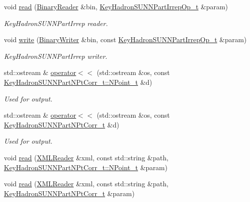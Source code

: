 \begin{DoxyCompactItemize}
\item 
void \mbox{\hyperlink{namespaceHadron_a05878acca51117e3c410ba16500c4ba5}{read}} (\mbox{\hyperlink{classADATIO_1_1BinaryReader}{Binary\+Reader}} \&bin, \mbox{\hyperlink{structHadron_1_1KeyHadronSUNNPartIrrepOp__t}{Key\+Hadron\+S\+U\+N\+N\+Part\+Irrep\+Op\+\_\+t}} \&param)
\begin{DoxyCompactList}\small\item\em Key\+Hadron\+S\+U\+N\+N\+Part\+Irrep reader. \end{DoxyCompactList}\item 
void \mbox{\hyperlink{namespaceHadron_a1ab9211268895b4f05c4d46ff18dff6d}{write}} (\mbox{\hyperlink{classADATIO_1_1BinaryWriter}{Binary\+Writer}} \&bin, const \mbox{\hyperlink{structHadron_1_1KeyHadronSUNNPartIrrepOp__t}{Key\+Hadron\+S\+U\+N\+N\+Part\+Irrep\+Op\+\_\+t}} \&param)
\begin{DoxyCompactList}\small\item\em Key\+Hadron\+S\+U\+N\+N\+Part\+Irrep writer. \end{DoxyCompactList}\item 
std\+::ostream \& \mbox{\hyperlink{namespaceHadron_a2559588d0550564638289369a0d3ba30}{operator$<$$<$}} (std\+::ostream \&os, const \mbox{\hyperlink{structHadron_1_1KeyHadronSUNNPartNPtCorr__t_1_1NPoint__t}{Key\+Hadron\+S\+U\+N\+N\+Part\+N\+Pt\+Corr\+\_\+t\+::\+N\+Point\+\_\+t}} \&d)
\begin{DoxyCompactList}\small\item\em Used for output. \end{DoxyCompactList}\item 
std\+::ostream \& \mbox{\hyperlink{namespaceHadron_af2ff7a4948a4b5cdeaabc1de5072918c}{operator$<$$<$}} (std\+::ostream \&os, const \mbox{\hyperlink{structHadron_1_1KeyHadronSUNNPartNPtCorr__t}{Key\+Hadron\+S\+U\+N\+N\+Part\+N\+Pt\+Corr\+\_\+t}} \&d)
\begin{DoxyCompactList}\small\item\em Used for output. \end{DoxyCompactList}\item 
void \mbox{\hyperlink{namespaceHadron_aaef0a2bed7d8dd73e0611d46f68b4ee6}{read}} (\mbox{\hyperlink{classADATXML_1_1XMLReader}{X\+M\+L\+Reader}} \&xml, const std\+::string \&path, \mbox{\hyperlink{structHadron_1_1KeyHadronSUNNPartNPtCorr__t_1_1NPoint__t}{Key\+Hadron\+S\+U\+N\+N\+Part\+N\+Pt\+Corr\+\_\+t\+::\+N\+Point\+\_\+t}} \&param)
\item 
void \mbox{\hyperlink{namespaceHadron_a921e2dea91400934dabd596c18164033}{read}} (\mbox{\hyperlink{classADATXML_1_1XMLReader}{X\+M\+L\+Reader}} \&xml, const std\+::string \&path, \mbox{\hyperlink{structHadron_1_1KeyHadronSUNNPartNPtCorr__t}{Key\+Hadron\+S\+U\+N\+N\+Part\+N\+Pt\+Corr\+\_\+t}} \&param)

\end{DoxyCompactItemize}
